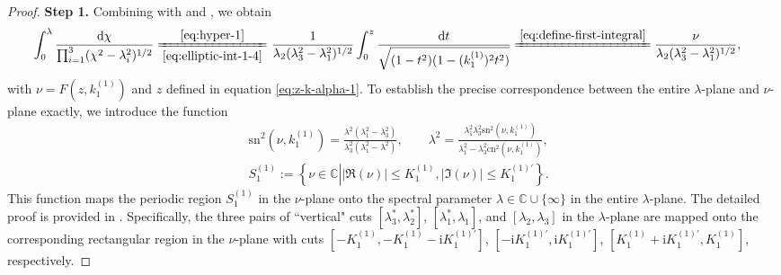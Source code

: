 \documentclass[11pt,reqno]{amsart}
\newcommand{\ii}{\mathrm{i}}
\newcommand{\sn}{\mathrm{sn}}
\newcommand{\cn}{\mathrm{cn}}
\newcommand{\dd}{\mathrm{d}}
\numberwithin{equation}{section}
\begin{document}
\begin{proof}
	\textbf{Step 1.}
	Combining with  and , 
	we obtain 
	\begin{equation}\nonumber
		\begin{split}
			\int_{0}^{\lambda}\frac{\dd \chi}{\prod_{i=1}^3(\chi^2-\lambda_i^2)^{1/2}}\xlongequal[\eqref{eq:elliptic-int-1-4}]{\eqref{eq:hyper-1}}&\ \frac{1}{\lambda_2(\lambda_3^2-\lambda_1^2)^{1/2}}
			\int_{0}^{z}\frac{\dd t}{\sqrt{(1-t^2)(1-(k^{(1)}_1)^2t^2)}}
		\xlongequal{\eqref{eq:define-first-integral}}
			\frac{\nu}{\lambda_2(\lambda_3^2-\lambda_1^2)^{1/2}},
		\end{split}	
	\end{equation}
	with $\nu=F(z,k^{(1)}_1)$ and $z$ defined in equation \eqref{eq:z-k-alpha-1}.
	To establish the precise correspondence between the entire $\lambda$-plane and $\nu$-plane exactly,
	we introduce the function
	\begin{equation}\label{eq:fs-2}
		\begin{split}
			& \sn^2(\nu,  k^{(1)}_1)=\frac{\lambda^2(\lambda_1^2-\lambda_3^2)}{\lambda_3^2(\lambda_1^2-\lambda^2)}, \qquad \lambda^2=\frac{\lambda_1^2\lambda_3^2\sn^2(\nu,  k^{(1)}_1)}{\lambda_1^2-\lambda_3^2\cn^2(\nu,  k^{(1)}_1)}, \\
			& S^{(1)}_1:=\left\{\nu\in \mathbb{C}\left| |\Re(\nu)| \le   K^{(1)}_1, |\Im(\nu)| \le   K^{(1)\prime}_1 \right.\right\}.
		\end{split}
	\end{equation}
	This function maps the periodic region $S^{(1)} _{1}$
	in the $\nu$-plane onto the spectral parameter $\lambda \in \mathbb{C} \cup \{\infty\}$ in the entire $\lambda$-plane. 
	The detailed proof is provided in . 
	Specifically, the three pairs of ``vertical" cuts $[\lambda_3^*,\lambda_2^*]$, $[\lambda_1^*,\lambda_1]$, and $[\lambda_2, \lambda_3]$ in the $\lambda$-plane are mapped onto the corresponding rectangular region in the $\nu$-plane with cuts $[-K^{(1)}_1, -K^{(1)}_1-\ii K^{(1)\prime}_1]$, $[-\ii K^{(1)\prime}_1, \ii K^{(1)\prime}_1]$, $[K^{(1)}_1+\ii K^{(1)\prime}_1, K^{(1)}_1]$, respectively.
	

\end{proof}
\end{document}

